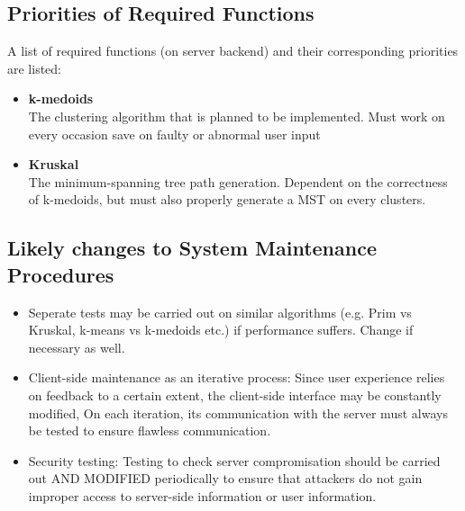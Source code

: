 \documentclass[12pt]{article}
\begin{document}
\subsection{Priorities of Required Functions}
A list of required functions (on server backend) and their corresponding priorities are listed:
\begin{itemize}
	\item \textbf{k-medoids}\\
		The clustering algorithm that is planned to be implemented. Must work on
		every occasion save on faulty or abnormal user input
	\item \textbf{Kruskal}\\
		The minimum-spanning tree path generation. Dependent on the correctness
		of k-medoids, but must also properly generate a MST on every clusters.
\end{itemize}
\subsection{Likely changes to System Maintenance Procedures}
\begin{itemize}
	\item Seperate tests may be carried out on similar algorithms (e.g. Prim vs Kruskal,
	k-means vs k-medoids etc.) if performance suffers. Change if necessary as well.
	\item Client-side maintenance as an iterative process: Since user experience 
	relies on feedback to a certain extent, the client-side interface may be
	constantly modified, On each iteration, its communication with the server
	must always be tested to ensure flawless communication.
	\item Security testing: Testing to check server compromisation should be carried
	out AND MODIFIED periodically to ensure that attackers do not gain improper access to 
	server-side information or user information. 
\end{itemize}
\end{document}
